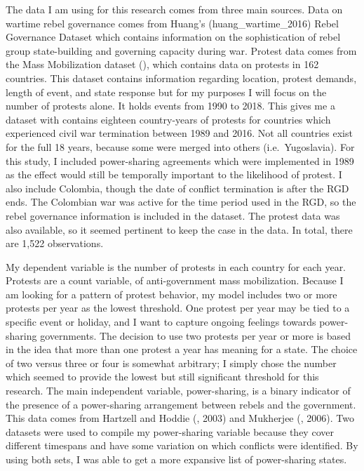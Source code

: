 \documentclass[12pt,]{article}
\begin{document}
The data I am using for this research comes from three main sources.
Data on wartime rebel governance comes from Huang's
(huang\_wartime\_2016) Rebel Governance Dataset which contains
information on the sophistication of rebel group state-building and
governing capacity during war. Protest data comes from the Mass
Mobilization dataset (\citet{clark_mass_2016}), which contains data on
protests in 162 countries. This dataset contains information regarding
location, protest demands, length of event, and state response but for
my purposes I will focus on the number of protests alone. It holds
events from 1990 to 2018. This gives me a dataset with contains eighteen
country-years of protests for countries which experienced civil war
termination between 1989 and 2016. Not all countries exist for the full
18 years, because some were merged into others (i.e.~Yugoslavia). For
this study, I included power-sharing agreements which were implemented
in 1989 as the effect would still be temporally important to the
likelihood of protest. I also include Colombia, though the date of
conflict termination is after the RGD ends. The Colombian war was active
for the time period used in the RGD, so the rebel governance information
is included in the dataset. The protest data was also available, so it
seemed pertinent to keep the case in the data. In total, there are 1,522
observations.

My dependent variable is the number of protests in each country for each
year. Protests are a count variable, of anti-government mass
mobilization. Because I am looking for a pattern of protest behavior, my
model includes two or more protests per year as the lowest threshold.
One protest per year may be tied to a specific event or holiday, and I
want to capture ongoing feelings towards power-sharing governments. The
decision to use two protests per year or more is based in the idea that
more than one protest a year has meaning for a state. The choice of two
versus three or four is somewhat arbitrary; I simply chose the number
which seemed to provide the lowest but still significant threshold for
this research. The main independent variable, power-sharing, is a binary
indicator of the presence of a power-sharing arrangement between rebels
and the government. This data comes from Hartzell and Hoddie
(\citet{hartzell_institutionalizing_2008}, 2003) and Mukherjee
(\citet{mukherjee_why_2006}, 2006). Two datasets were used to compile my
power-sharing variable because they cover different timespans and have
some variation on which conflicts were identified. By using both sets, I
was able to get a more expansive list of power-sharing states.
\end{document}
